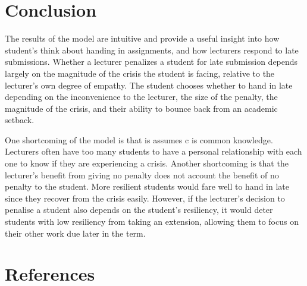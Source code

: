\documentclass[11pt,preprint, authoryear]{elsarticle}
\numberwithin{equation}{section}
\numberwithin{figure}{section}
\numberwithin{table}{section}
\begin{document}
\hypertarget{conclusion}{%
\section{\texorpdfstring{Conclusion
\label{con}}{Conclusion }}\label{conclusion}}

The results of the model are intuitive and provide a useful insight into
how student's think about handing in assignments, and how lecturers
respond to late submissions. Whether a lecturer penalizes a student for
late submission depends largely on the magnitude of the crisis the
student is facing, relative to the lecturer's own degree of empathy. The
student chooses whether to hand in late depending on the inconvenience
to the lecturer, the size of the penalty, the magnitude of the crisis,
and their ability to bounce back from an academic setback.

One shortcoming of the model is that is assumes c is common knowledge.
Lecturers often have too many students to have a personal relationship
with each one to know if they are experiencing a crisis. Another
shortcoming is that the lecturer's benefit from giving no penalty does
not account the benefit of no penalty to the student. More resilient
students would fare well to hand in late since they recover from the
crisis easily. However, if the lecturer's decision to penalise a student
also depends on the student's resiliency, it would deter students with
low resiliency from taking an extension, allowing them to focus on their
other work due later in the term.

\newpage

\hypertarget{references}{%
\section*{References}\label{references}}
\end{document}
